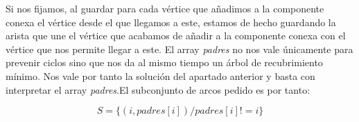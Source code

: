 \documentclass[12pt]{article}
\begin{document}
Si nos fijamos, al guardar para cada vértice que añadimos a la componente conexa el
vértice desde el que llegamos a este, estamos de hecho guardando la arista que une
el vértice que acabamos de añadir a la componente conexa con el vértice que nos 
permite llegar a este. El array \textit{padres} no nos vale únicamente para prevenir
ciclos sino que nos da al mismo tiempo un árbol de recubrimiento mínimo. Nos vale
por tanto la solución del apartado anterior y basta con interpretar el array
\textit{padres}.El subconjunto de arcos pedido es por tanto:

\setlength{\parskip}{0mm}


    \[S = \{(i,padres[i]) / padres[i] != i\}\]
\end{document}
